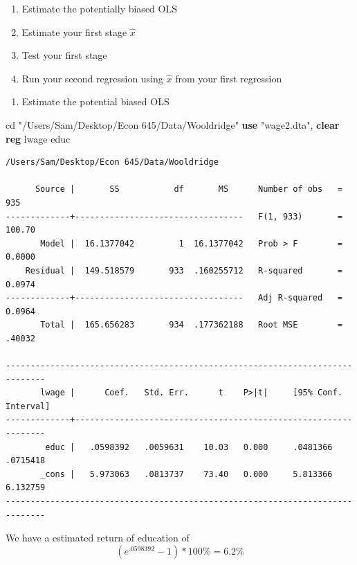 \documentclass[
]{book}
\newenvironment{Shaded}{\begin{snugshade}}{\end{snugshade}}
\newcommand{\KeywordTok}[1]{\textcolor[rgb]{0.13,0.29,0.53}{\textbf{#1}}}
\newcommand{\NormalTok}[1]{#1}
\newcommand{\StringTok}[1]{\textcolor[rgb]{0.31,0.60,0.02}{#1}}
\providecommand{\tightlist}{%
  \setlength{\itemsep}{0pt}\setlength{\parskip}{0pt}}
\begin{document}
\begin{enumerate}
\def\labelenumi{\arabic{enumi}.}
\tightlist
\item
  Estimate the potentially biased OLS
\item
  Estimate your first stage \(\hat{x}\)
\item
  Test your first stage
\item
  Run your second regression using \(\hat{x}\) from your first regression
\end{enumerate}

\begin{enumerate}
\def\labelenumi{\arabic{enumi})}
\tightlist
\item
  Estimate the potential biased OLS
\end{enumerate}

\begin{Shaded}
\begin{Highlighting}[]
\NormalTok{cd }\StringTok{"/Users/Sam/Desktop/Econ 645/Data/Wooldridge"}
\KeywordTok{use} \StringTok{"wage2.dta"}\NormalTok{, }\KeywordTok{clear}
\KeywordTok{reg}\NormalTok{ lwage educ}
\end{Highlighting}
\end{Shaded}

\begin{verbatim}
/Users/Sam/Desktop/Econ 645/Data/Wooldridge

      Source |       SS           df       MS      Number of obs   =       935
-------------+----------------------------------   F(1, 933)       =    100.70
       Model |  16.1377042         1  16.1377042   Prob > F        =    0.0000
    Residual |  149.518579       933  .160255712   R-squared       =    0.0974
-------------+----------------------------------   Adj R-squared   =    0.0964
       Total |  165.656283       934  .177362188   Root MSE        =    .40032

------------------------------------------------------------------------------
       lwage |      Coef.   Std. Err.      t    P>|t|     [95% Conf. Interval]
-------------+----------------------------------------------------------------
        educ |   .0598392   .0059631    10.03   0.000     .0481366    .0715418
       _cons |   5.973063   .0813737    73.40   0.000     5.813366    6.132759
------------------------------------------------------------------------------
\end{verbatim}

We have a estimated return of education of \[ (e^{.0598392}-1)*100\% = 6.2\% \]
\end{document}
